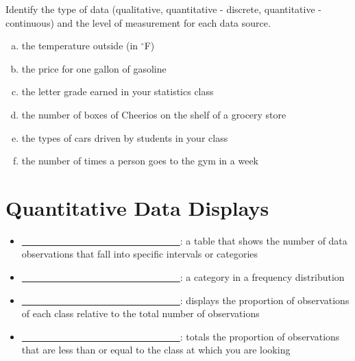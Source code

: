 \documentclass[12pt, letterpaper]{article}
\newcounter{exercise}
\theoremstyle{definition}
\begin{document}
\begin{exercise}
Identify the type of data (qualitative, quantitative - discrete, quantitative - continuous) and the level of measurement for each data source.
\begin{enumerate}[(a)]
\item the temperature outside (in ${}^{\circ}$F)
\item the price for one gallon of gasoline
\item the letter grade earned in your statistics class
\item the number of boxes of Cheerios on the shelf of a grocery store
\item the types of cars driven by students in your class
\item the number of times a person goes to the gym in a week
\end{enumerate}
\end{exercise}

\vfill

\newpage

\section*{Quantitative Data Displays}

\begin{defn}
\begin{itemize}

\item \underline{~~~~~~~~~~~~~~~~~~~~~~~~~~~~~~~~~}:  a table that shows the number of data observations that fall into specific intervals or categories

\item \underline{~~~~~~~~~~~~~~~~~~~~~~~~~~~~~~~~~}:  a category in a frequency distribution

\item \underline{~~~~~~~~~~~~~~~~~~~~~~~~~~~~~~~~~}:  displays the proportion of observations of each class relative to the total number of observations


\item \underline{~~~~~~~~~~~~~~~~~~~~~~~~~~~~~~~~~}: totals the proportion of observations that are less than or equal to the class at which you are looking


\end{itemize}
\end{defn}
\end{document}
